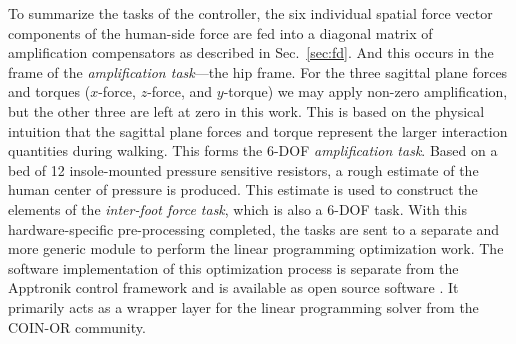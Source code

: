 \documentclass[utf8]{frontiersSCNS}
\renewcommand*{\cite}[1]{\citep{#1}}
\begin{document}

To summarize the tasks of the controller, the six individual spatial force vector components of the human-side force are fed into a diagonal matrix of amplification compensators as described in Sec.~\ref{sec:fd}. And this occurs in the frame of the \emph{amplification task}---the hip frame. For the three sagittal plane forces and torques ($x$-force, $z$-force, and $y$-torque) we may apply non-zero amplification, but the other three are left at zero in this work. This is based on the physical intuition that the sagittal plane forces and torque represent the larger interaction quantities during walking. This forms the 6-DOF \emph{amplification task}.
Based on a bed of 12 insole-mounted pressure sensitive resistors, a rough estimate of the human center of pressure is produced. This estimate is used to construct the elements of the \emph{inter-foot force task}, which is also a 6-DOF task.
With this hardware-specific pre-processing completed, the tasks are sent to a separate and more generic module to perform the linear programming optimization work. The software implementation of this optimization process is separate from the Apptronik control framework and is available as open source software \cite{Thomas2019LPExo}. It primarily acts as a wrapper layer for the linear programming solver from the COIN-OR \cite{LougeeHeimer2003IBM} community.
\end{document}
